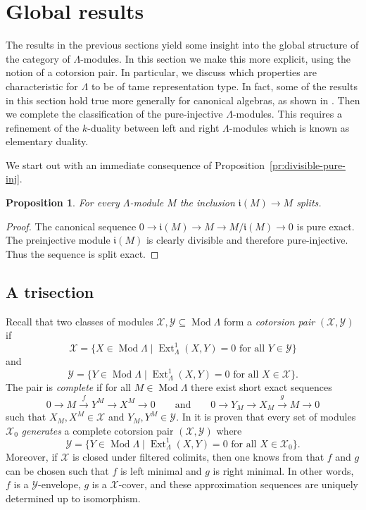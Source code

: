 \documentclass[a4paper]{amsart}
\theoremstyle{plain}
\newtheorem{prop}[thm]{Proposition}
\theoremstyle{definition}
\theoremstyle{remark}
\numberwithin{equation}{section}
\newcommand{\Ext}{\operatorname{Ext}}
\newcommand{\Mod}{\operatorname{Mod}}
\def\X{\mathcal X}
\def\Y{\mathcal Y}
\newcommand{\fri}{\mathfrak i}
\def\La{\Lambda}
\begin{document}
\section{Global results}

The results in the previous sections yield some insight into the
global structure of the category of $\La$-modules. In this section we
make this more explicit, using the notion of a cotorsion pair. In particular, we
discuss which properties are characteristic for $\La$ to be of tame
representation type.  In fact, some of the results in this section
hold true more generally for canonical algebras, as shown in
\cite{RR}. Then we complete the classification of the pure-injective $\La$-modules.
This requires a refinement of the $k$-duality between left and right
$\Lambda$-modules which is known as
elementary duality. 

We start out with an immediate consequence of
Proposition~\ref{pr:divisible-pure-inj}.

\begin{prop}\label{pr:preinjectives-split}
For every $\La$-module $M$ the inclusion $\fri(M)\to M$ splits.
\end{prop}
\begin{proof}
  The canonical sequence $0\to \fri(M)\to M\to M/\fri(M)\to 0$ is
  pure exact. The preinjective module $\fri(M)$ is clearly divisible
  and therefore pure-injective. Thus the sequence is split exact.
\end{proof}

\subsection*{A trisection}

Recall that two classes of modules $\X,\Y \subseteq \Mod\La$
form a \emph{cotorsion pair} $(\X,\Y)$ if
\[\X = \{X\in\Mod\La\mid\Ext^1_\La(X,Y)=0\text{ for all
  }Y\in\Y\}\]
and
\[\Y = \{Y\in\Mod\La\mid\Ext^1_\La(X,Y)=0\text{ for all }X\in\X\}.\]
The pair is \emph{complete} if for all $M\in\Mod\La$ there exist short exact
sequences
\[0\to M \xrightarrow{f} Y^M \to X^M\to 0\qquad\text{and}\qquad
0\to Y_M\to X_M\xrightarrow{g} M\to 0\]
such that $X_M,X^M\in\X$ and $Y_M,Y^M\in \Y$. In \cite{ET} it is proven that every set of
modules $\X_0$ \emph{generates} a complete cotorsion pair
$(\X,\Y)$ where
\[\Y = \{Y\in\Mod\La\mid\Ext^1_\La(X,Y)=0\text{ for all }X\in\X_0\}.\]
Moreover, if $\X$ is closed under filtered colimits, then one knows
from \cite{E} that $f$ and $g$ can be chosen such that $f$ is  left
minimal and $g$ is right
minimal. In other words, $f$ is a $\Y$-envelope, $g$ is a $\X$-cover,
and these approximation sequences are uniquely determined up to
isomorphism.
\end{document}
